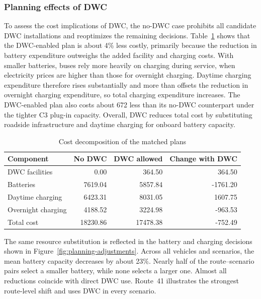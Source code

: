 \subsubsection{Planning effects of DWC}

To assess the cost implications of DWC, the no-DWC case prohibits all candidate DWC installations and reoptimizes the remaining decisions.
Table~\ref{tab:dwc-planning-costs} shows that the DWC-enabled plan is about 4\% less costly, primarily because the reduction in battery expenditure outweighs the added facility and charging costs.
With smaller batteries, buses rely more heavily on charging during service, when electricity prices are higher than those for overnight charging.
Daytime charging expenditure therefore rises substantially and more than offsets the reduction in overnight charging expenditure, so total charging expenditure increases.
The DWC-enabled plan also costs about 672 less than its no-DWC counterpart under the tighter C3 plug-in capacity.
Overall, DWC reduces total cost by substituting roadside infrastructure and daytime charging for onboard battery capacity.

\begin{table}[!htbp]
\centering
\small
\caption{Cost decomposition of the matched plans}
\label{tab:dwc-planning-costs}
\begin{tabular}{@{}lrrr@{}}
\toprule
Component & No DWC & DWC allowed & Change with DWC \\
\midrule
DWC facilities & 0.00 & 364.50 & 364.50 \\
Batteries & 7619.04 & 5857.84 & -1761.20 \\
Daytime charging & 6423.31 & 8031.05 & 1607.75 \\
Overnight charging & 4188.52 & 3224.98 & -963.53 \\
Total cost & 18230.86 & 17478.38 & -752.49 \\
\bottomrule
\end{tabular}
\end{table}

The same resource substitution is reflected in the battery and charging decisions shown in Figure~\ref{fig:planning-adjustments}.
Across all vehicles and scenarios, the mean battery capacity decreases by about 23\%.
Nearly half of the route--scenario pairs select a smaller battery, while none selects a larger one.
Almost all reductions coincide with direct DWC use.
Route~41 illustrates the strongest route-level shift and uses DWC in every scenario.

